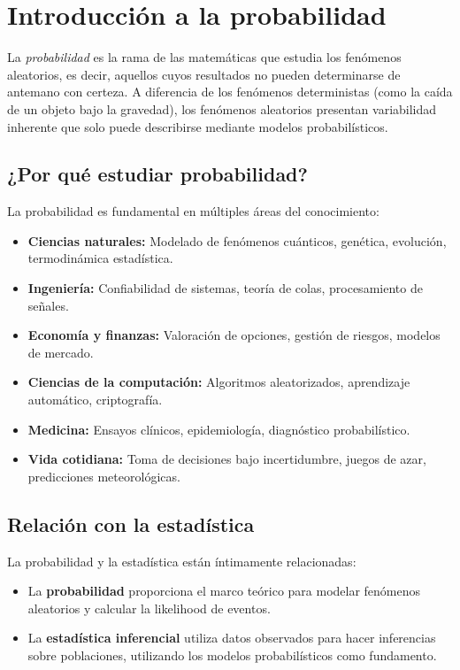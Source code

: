 \section*{Introducción a la probabilidad}

La \emph{probabilidad} es la rama de las matemáticas que estudia los fenómenos aleatorios, es decir, aquellos cuyos resultados no pueden determinarse de antemano con certeza. A diferencia de los fenómenos deterministas (como la caída de un objeto bajo la gravedad), los fenómenos aleatorios presentan variabilidad inherente que solo puede describirse mediante modelos probabilísticos.

\subsection*{¿Por qué estudiar probabilidad?}

La probabilidad es fundamental en múltiples áreas del conocimiento:

\begin{itemize}
	\item \textbf{Ciencias naturales:} Modelado de fenómenos cuánticos, genética, evolución, termodinámica estadística.
	\item \textbf{Ingeniería:} Confiabilidad de sistemas, teoría de colas, procesamiento de señales.
	\item \textbf{Economía y finanzas:} Valoración de opciones, gestión de riesgos, modelos de mercado.
	\item \textbf{Ciencias de la computación:} Algoritmos aleatorizados, aprendizaje automático, criptografía.
	\item \textbf{Medicina:} Ensayos clínicos, epidemiología, diagnóstico probabilístico.
	\item \textbf{Vida cotidiana:} Toma de decisiones bajo incertidumbre, juegos de azar, predicciones meteorológicas.
\end{itemize}

\subsection*{Relación con la estadística}

La probabilidad y la estadística están íntimamente relacionadas:

\begin{itemize}
	\item La \textbf{probabilidad} proporciona el marco teórico para modelar fenómenos aleatorios y calcular la likelihood de eventos.
	\item La \textbf{estadística inferencial} utiliza datos observados para hacer inferencias sobre poblaciones, utilizando los modelos probabilísticos como fundamento.
\end{itemize}

